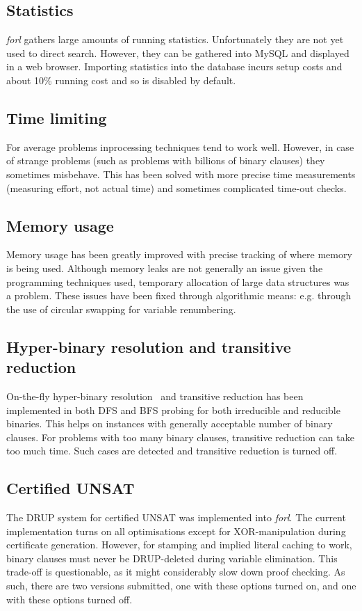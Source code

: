 \documentclass[final]{ieee}
\begin{document}
\subsection{Statistics}
\emph{forl} gathers large amounts of running statistics. Unfortunately they are not yet used to direct search. However, they can be gathered into MySQL and displayed in a web browser. Importing statistics into the database incurs setup costs and about 10\% running cost and so is disabled by default.

\subsection{Time limiting}
For average problems inprocessing techniques tend to work well. However, in case of strange problems (such as problems with billions of binary clauses) they sometimes misbehave. This has been solved with more precise time measurements (measuring effort, not actual time) and sometimes complicated time-out checks.

\subsection{Memory usage}
Memory usage has been greatly improved with precise tracking of where memory is being used. Although memory leaks are not generally an issue given the programming techniques used, temporary allocation of large data structures was a problem. These issues have been fixed through algorithmic means: e.g. through the use of circular swapping for variable renumbering.

\subsection{Hyper-binary resolution and transitive reduction}
On-the-fly hyper-binary resolution~\cite{DBLP:conf/sat/BacchusW03} and transitive reduction has been implemented in both DFS and BFS probing for both irreducible and reducible binaries. This helps on instances with generally acceptable number of binary clauses. For problems with too many binary clauses, transitive reduction can take too much time. Such cases are detected and transitive reduction is turned off.

\subsection{Certified UNSAT}
The DRUP system for certified UNSAT was implemented into \emph{forl}. The current implementation turns on all optimisations  except for XOR-manipulation during certificate generation. However, for stamping and implied literal caching to work, binary clauses must never be DRUP-deleted during variable elimination. This trade-off is questionable, as it might considerably slow down proof checking. As such, there are two versions submitted, one with these options turned on, and one with these options turned off.
\end{document}
